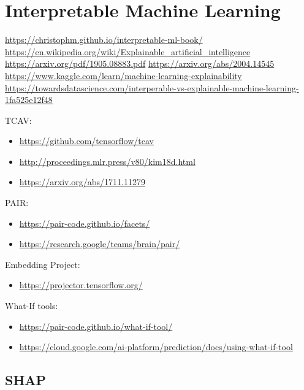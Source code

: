 \documentclass[
]{book}
\providecommand{\tightlist}{%
  \setlength{\itemsep}{0pt}\setlength{\parskip}{0pt}}
\begin{document}
\hypertarget{interpretable-machine-learning-1}{%
\chapter{Interpretable Machine Learning}\label{interpretable-machine-learning-1}}

\url{https://christophm.github.io/interpretable-ml-book/}
\url{https://en.wikipedia.org/wiki/Explainable_artificial_intelligence}
\url{https://arxiv.org/pdf/1905.08883.pdf}
\url{https://arxiv.org/abs/2004.14545}
\url{https://www.kaggle.com/learn/machine-learning-explainability}
\url{https://towardsdatascience.com/interperable-vs-explainable-machine-learning-1fa525e12f48}

TCAV:

\begin{itemize}
\tightlist
\item
  \url{https://github.com/tensorflow/tcav}
\item
  \url{http://proceedings.mlr.press/v80/kim18d.html}
\item
  \url{https://arxiv.org/abs/1711.11279}
\end{itemize}

PAIR:

\begin{itemize}
\tightlist
\item
  \url{https://pair-code.github.io/facets/}
\item
  \url{https://research.google/teams/brain/pair/}
\end{itemize}

Embedding Project:

\begin{itemize}
\tightlist
\item
  \url{https://projector.tensorflow.org/}
\end{itemize}

What-If tools:

\begin{itemize}
\tightlist
\item
  \url{https://pair-code.github.io/what-if-tool/}
\item
  \url{https://cloud.google.com/ai-platform/prediction/docs/using-what-if-tool}
\end{itemize}

\hypertarget{shap-1}{%
\section{SHAP}\label{shap-1}}
\end{document}
